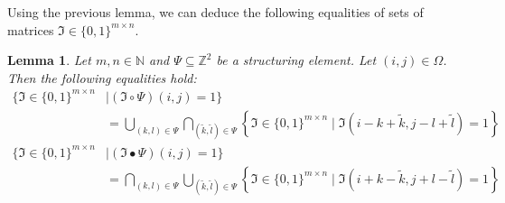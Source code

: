 \documentclass[a4paper,12pt]{article}
\theoremstyle{plain}
\newtheorem{lemma}[theorem]{Lemma}
\theoremstyle{definition}
\begin{document}
Using the previous lemma, we can deduce the following equalities of sets of matrices $\mathfrak{I} \in \{ 0, 1 \}^{m \times n}$.

\begin{lemma}
	Let $m, n \in \mathbb{N}$ and $\Psi \subseteq \mathbb{Z}^2$ be a structuring element. Let $(i, j) \in \Omega$. Then the following equalities hold:
	\begin{equation}
		\begin{aligned}
			\big\{ \mathfrak{I} \in \{ 0, 1 \}^{m \times n} &\mid (\mathfrak{I} \circ \Psi)(i, j) = 1 \big\} \\
			&= \bigcup_{(k, l) \in \Psi} \bigcap_{(\tilde{k}, \tilde{l}) \in \Psi} \left\{ \mathfrak{I} \in \{ 0, 1 \}^{m \times n} \mid \mathfrak{I}(i - k + \tilde{k}, j - l + \tilde{l}) = 1 \right\} \label{eq: openingset}
		\end{aligned}
	\end{equation}
	\begin{equation}
		\begin{aligned}
			\big\{ \mathfrak{I} \in \{ 0, 1 \}^{m \times n} &\mid (\mathfrak{I} \bullet \Psi)(i, j) = 1 \big\} \\
			&= \bigcap_{(k, l) \in \Psi} \bigcup_{(\tilde{k}, \tilde{l}) \in \Psi} \left\{ \mathfrak{I} \in \{ 0, 1 \}^{m \times n} \mid \mathfrak{I}(i + k - \tilde{k}, j + l - \tilde{l}) = 1 \right\} \label{eq: closingset}
		\end{aligned}
	\end{equation}
\end{lemma}
\end{document}
